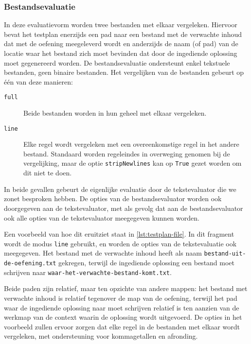 \subsubsection{Bestandsevaluatie}

In deze evaluatievorm worden twee bestanden met elkaar vergeleken.
Hiervoor bevat het testplan enerzijds een pad naar een bestand met de verwachte inhoud dat met de oefening meegeleverd wordt en anderzijds de naam (of pad) van de locatie waar het bestand zich moet bevinden dat door de ingediende oplossing moet gegenereerd worden.
De bestandsevaluatie ondersteunt enkel tekstuele bestanden, geen binaire bestanden.
Het vergelijken van de bestanden gebeurt op één van deze manieren:

\begin{description}
    \item[\texttt{full}] Beide bestanden worden in hun geheel met elkaar vergeleken.
    \item[\texttt{line}] Elke regel wordt vergeleken met een overeenkomstige regel in het andere bestand.
    Standaard worden regeleindes in overweging genomen bij de vergelijking, maar de optie \texttt{stripNewlines} kan op \texttt{True} gezet worden om dit niet te doen.
\end{description}

In beide gevallen gebeurt de eigenlijke evaluatie door de tekstevaluator die we zonet besproken hebben.
De opties van de bestandsevaluator worden ook doorgegeven aan de tekstevaluator, met als gevolg dat aan de bestandsevaluator ook alle opties van de tekstevaluator meegegeven kunnen worden.

Een voorbeeld van hoe dit eruitziet staat in \cref{lst:testplan-file}.
In dit fragment wordt de modus \texttt{line} gebruikt, en worden de opties van de tekstevaluatie ook meegegeven.
Het bestand met de verwachte inhoud heeft als naam \texttt{bestand-uit-de-oefening.txt} gekregen, terwijl de ingediende oplossing een bestand moet schrijven naar \texttt{waar-het-verwachte-bestand-komt.txt}.

Beide paden zijn relatief, maar ten opzichte van andere mappen: het bestand met verwachte inhoud is relatief tegenover de map van de oefening, terwijl het pad waar de ingediende oplossing naar moet schrijven relatief is ten aanzien van de werkmap van de context waarin de oplossing wordt uitgevoerd.
De opties in het voorbeeld zullen ervoor zorgen dat elke regel in de bestanden met elkaar wordt vergeleken, met ondersteuning voor kommagetallen en afronding.

